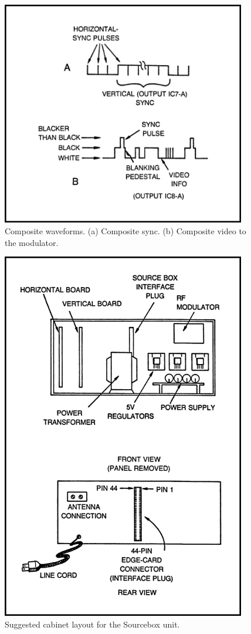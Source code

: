 \documentclass[11pt]{book}              %
\begin{document}
\begin{figure}
  \centering
  \includegraphics[width=0.95\textwidth]{images/fig2-9}
  \caption{Composite waveforms. (a) Composite sync. (b) Composite video to the modulator.}
\end{figure}

\begin{figure}
  \centering
  \includegraphics[width=0.95\textwidth]{images/fig2-10}
  \caption{Suggested cabinet layout for the Sourcebox unit.}
\end{figure}
\end{document}
